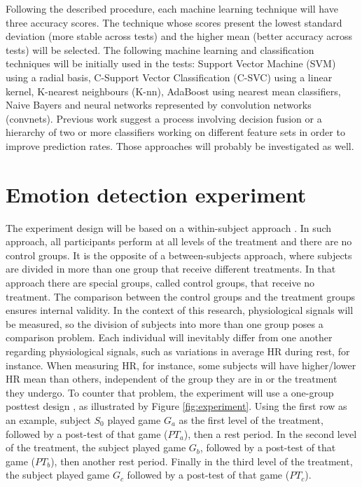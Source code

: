 Following the described procedure, each machine learning technique will have three accuracy scores. The technique whose scores present the lowest standard deviation (more stable across tests) and the higher mean (better accuracy across tests) will be selected. The following machine learning and classification techniques will be initially used in the tests: Support Vector Machine (SVM) using a radial basis, C-Support Vector Classification (C-SVC) using a linear kernel, K-nearest neighbours (K-nn), AdaBoost using nearest mean classifiers, Naive Bayers and neural networks represented by convolution networks (convnets). Previous work suggest a process involving decision fusion or a hierarchy of two or more classifiers working on different feature sets in order to improve prediction rates. Those approaches will probably be investigated as well.

\section{Emotion detection experiment}

The experiment design will be based on a within-subject approach \cite{lane2015online}. In such approach, all participants perform at all levels of the treatment and there are no control groups. It is the opposite of a between-subjects approach, where subjects are divided in more than one group that receive different treatments. In that approach there are special groups, called control groups, that receive no treatment. The comparison between the control groups and the treatment groups ensures internal validity. In the context of this research, physiological signals will be measured, so the division of subjects into more than one group poses a comparison problem. Each individual will inevitably differ from one another regarding physiological signals, such as variations in average HR during rest, for instance. When measuring HR, for instance, some subjects will have higher/lower HR mean than others, independent of the group they are in or the treatment they undergo. To counter that problem, the experiment will use a one-group posttest design \cite{kirk1982experimental}, as illustrated by Figure \ref{fig:experiment}. Using the first row as an example, subject $S_0$ played game $G_a$ as the first level of the treatment, followed by a post-test of that game ($PT_a$), then a rest period. In the second level of the treatment, the subject played game $G_b$, followed by a post-test of that game ($PT_b$), then another rest period. Finally in the third level of the treatment, the subject played game $G_c$ followed by a post-test of that game ($PT_c$).

